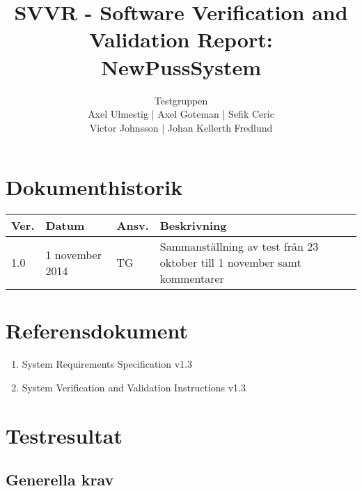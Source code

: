\documentclass[a4paper]{article}
\title{SVVR - Software Verification and Validation Report: NewPussSystem}
\author{Testgruppen \\ Axel Ulmestig | Axel Goteman | Sefik Ceric \\ Victor Johnsson | Johan Kellerth Fredlund}
\date{}
\begin{document}
\maketitle
\thispagestyle{fancy}
\tableofcontents
\newpage

\section*{Dokumenthistorik}

\begin{tabular}{ l l l p{9cm} }
Ver. & Datum & Ansv. & Beskrivning \\\hline
1.0 & 1 november 2014 & TG & Sammanställning av test från 23 oktober till 1 november samt kommentarer \\
\end{tabular}
     

\section{Referensdokument}
\begin{enumerate}
\item System Requirements Specification v1.3
\item System Verification and Validation Instructions v1.3
\end{enumerate}



\section{Testresultat}


\subsection{Generella krav}
\end{document}
